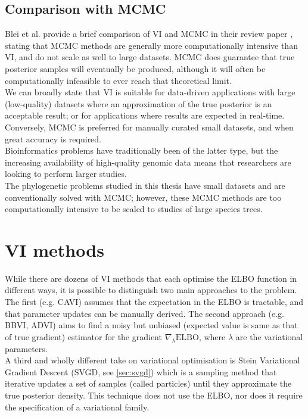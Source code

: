 \subsection{Comparison with MCMC}

\par Blei et al. provide a brief comparison of VI and MCMC in their review paper \parencite{vi-review}, stating that MCMC methods are generally more computationally intensive than VI, and do not scale as well to large datasets. MCMC does guarantee that true posterior samples will eventually be produced, although it will often be computationally infeasible to ever reach that theoretical limit.
\\
We can broadly state that VI is suitable for data-driven applications with large (low-quality) datasets where an approximation of the true posterior is an acceptable result; or for applications where results are expected in real-time. Conversely, MCMC is preferred for manually curated small datasets, and when great accuracy is required. 
\\
Bioinformatics problems have traditionally been of the latter type, but the increasing availability of high-quality genomic data means that researchers are looking to perform larger studies.
\\
The phylogenetic problems studied in this thesis have small datasets and are conventionally solved with MCMC; however, these MCMC methods are too computationally intensive to be scaled to studies of large species trees.


\section{VI methods} \label{sec:vi-methods}

While there are dozens of VI methods that each optimise the ELBO function in different ways, it is possible to distinguish two main approaches to the problem. The first (e.g. CAVI) assumes that the expectation in the ELBO is tractable, and that parameter updates can be manually derived. The second approach (e.g. BBVI, ADVI) aims to find a noisy but unbiased (expected value is same as that of true gradient) estimator for the gradient $\nabla_{\lambda}\mathrm{ELBO}$, where $\lambda$ are the variational parameters.
\\
A third and wholly different take on variational optimisation is Stein Variational Gradient Descent (SVGD, see \ref{sec:svgd}) which is a sampling method that iterative updates a set of samples (called particles) until they approximate the true posterior density. This technique does not use the ELBO, nor does it require the specification of a variational family.

